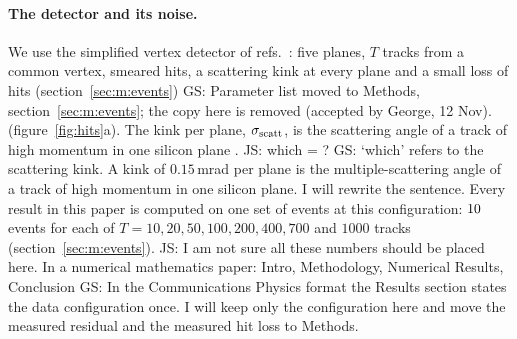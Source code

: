 \documentclass[11pt,a4paper]{article}
\newcommand{\js}[1]{{\color{blue} JS: #1 }}
\newcommand{\gs}[1]{{\color{orange!85!black} GS: #1 }}
\newcommand{\gss}[1]{{\color{teal} #1}}
\begin{document}
\paragraph{The detector and its noise.}
We use the simplified vertex detector of refs.~\cite{nicotra2023,trackhhl}: \gss{five planes, $T$ tracks from a common vertex, smeared hits, a scattering kink at every plane and a small loss of hits (section~\ref{sec:m:events})} \gs{Parameter list moved to Methods, section~\mbox{\ref{sec:m:events}}; the copy here is removed (accepted by George, 12 Nov).}  (figure~\ref{fig:hits}a).  \gss{The kink per plane, $\sigma_{\rm scatt}$, is} the scattering angle of a
track of high momentum in one silicon plane\gss{.} \js{which = ?} \gs{`which' refers to the scattering kink. A kink of $0.15$\,mrad per plane is the multiple-scattering angle of a track of high momentum in one silicon plane. I will rewrite the sentence.  }  Every result in this paper is
computed on one set of events at this configuration: $10$ events for each of
$T=10,20,50,100,200,400,700$ and $1000$ tracks (section~\ref{sec:m:events}). \js{I am not sure all these numbers should be placed here. In a numerical mathematics paper: Intro, Methodology, Numerical Results, Conclusion} \gs{In the Communications Physics format the Results section states the data configuration once. I will keep only the configuration here and move the measured residual and the measured hit loss to Methods.  }
\end{document}
